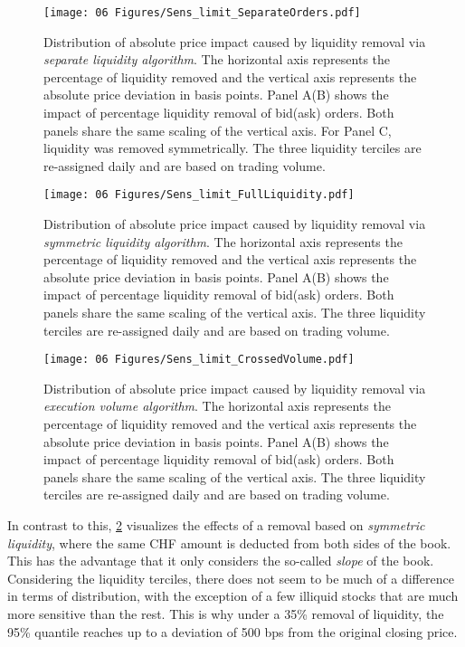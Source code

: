 \documentclass[11pt,a4paper, notitlepage]{article}
\begin{document}
	
	\begin{figure}[tp]
		\centering
		\texttt{[image: 06 Figures/Sens\_limit\_SeparateOrders.pdf]}
		\caption{Distribution of absolute price impact caused by liquidity removal via \textit{separate liquidity algorithm}. The horizontal axis represents the percentage of liquidity removed and the vertical axis represents the absolute price deviation in basis points. Panel A(B) shows the impact of percentage liquidity removal of bid(ask) orders. Both panels share the same scaling of the vertical axis. For Panel C, liquidity was removed symmetrically. The three liquidity terciles are re-assigned daily and are based on trading volume.}
		\label{fig:SensLimSeparate}
	\end{figure}
	
	\begin{figure}[tp]
		\centering
		\texttt{[image: 06 Figures/Sens\_limit\_FullLiquidity.pdf]}
		\caption{Distribution of absolute price impact caused by liquidity removal via \textit{symmetric liquidity algorithm}. The horizontal axis represents the percentage of liquidity removed and the vertical axis represents the absolute price deviation in basis points. Panel A(B) shows the impact of percentage liquidity removal of bid(ask) orders. Both panels share the same scaling of the vertical axis. The three liquidity terciles are re-assigned daily and are based on trading volume.}
		\label{fig:SensLimSymmetric}
	\end{figure}
	
	\begin{figure}[tp]
		\centering
		\texttt{[image: 06 Figures/Sens\_limit\_CrossedVolume.pdf]}
		\caption{Distribution of absolute price impact caused by liquidity removal via \textit{execution volume algorithm}. The horizontal axis represents the percentage of liquidity removed and the vertical axis represents the absolute price deviation in basis points. Panel A(B) shows the impact of percentage liquidity removal of bid(ask) orders. Both panels share the same scaling of the vertical axis. The three liquidity terciles are re-assigned daily and are based on trading volume.}
		\label{fig:SensLimVolume}
	\end{figure}
	
	In contrast to this, \cref{fig:SensLimSymmetric} visualizes the effects of a removal based on \emph{symmetric liquidity}, where the same CHF amount is deducted from both sides of the book. This has the advantage that it only considers the so-called \emph{slope} of the book. Considering the liquidity terciles, there does not seem to be much of a difference in terms of distribution, with the exception of a few illiquid stocks that are much more sensitive than the rest. This is why under a 35\% removal of liquidity, the 95\% quantile reaches up to a deviation of 500 bps from the original closing price.
	
\end{document}
